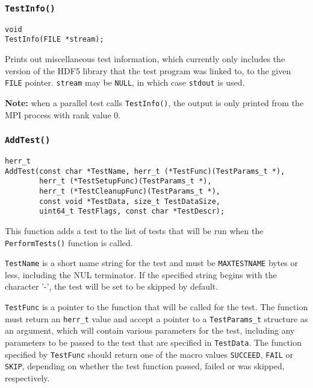 \documentclass[../HDF5_RFC.tex]{subfiles}
\begin{document}
\subsubsection{\texttt{TestInfo()}}

\begin{verbatim}
void
TestInfo(FILE *stream);
\end{verbatim}

Prints out miscellaneous test information, which currently only includes the version of the HDF5
library that the test program was linked to, to the given \texttt{FILE} pointer. \texttt{stream} may be \texttt{NULL}, in which case \texttt{stdout} is used.

\textbf{Note:} when a parallel test calls \texttt{TestInfo()}, the output is only printed from the MPI
process with rank value 0.

\subsubsection{\texttt{AddTest()}}
\label{apdx:testframe_addtest}

\begin{verbatim}
herr_t
AddTest(const char *TestName, herr_t (*TestFunc)(TestParams_t *),
        herr_t (*TestSetupFunc)(TestParams_t *),
        herr_t (*TestCleanupFunc)(TestParams_t *),
        const void *TestData, size_t TestDataSize,
        uint64_t TestFlags, const char *TestDescr);
\end{verbatim}

This function adds a test to the list of tests that will be run when the \texttt{PerformTests()}
function is called.

\texttt{TestName} is a short name string for the test and must be \texttt{MAXTESTNAME} bytes or less,
including the NUL terminator. If the specified string begins with the character '-', the test will
be set to be skipped by default.

\texttt{TestFunc} is a pointer to the function that will be called for the test. The function must
return an \texttt{herr\_t} value and accept a pointer to a \texttt{TestParams\_t} structure as an
argument, which will contain various parameters for the test, including any parameters to be passed
to the test that are specified in \texttt{TestData}. The function specified by \texttt{TestFunc}
should return one of the macro values \texttt{SUCCEED}, \texttt{FAIL} or \texttt{SKIP}, depending
on whether the test function passed, failed or was skipped, respectively.
\end{document}
